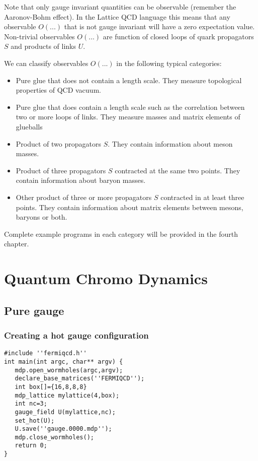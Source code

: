 Note that only gauge invariant quantities can be observable (remember the
Aaronov-Bohm effect). In the Lattice QCD language this means that any
observable $O(...)$ that is not gauge invariant will have a zero expectation
value. Non-trivial observables $O(...)$ are function of closed loops of
quark propagators $S$ and products of links $U$.

We can classify observables $O(...)$ in the following typical categories:

\begin{itemize}
\item  Pure glue that does not contain a length scale. They measure
topological properties of QCD vacuum.

\item  Pure glue that does contain a length scale such as the correlation
between two or more loops of links. They measure masses and matrix elements
of glueballs

\item  Product of two propagators $S$. They contain information about meson
masses.

\item  Product of three propagators $S$ contracted at the same two points.
They contain information about baryon masses.

\item  Other product of three or more propagators $S$ contracted in at least
three points. They contain information about matrix elements between mesons,
baryons or both.
\end{itemize}

Complete example programs in each category will be provided in the fourth
chapter.

\section{Quantum Chromo Dynamics}

\subsection{Pure gauge}

\subsubsection{Creating a hot gauge configuration}
\begin{verbatim}
#include ''fermiqcd.h''
int main(int argc, char** argv) {
   mdp.open_wormholes(argc,argv);
   declare_base_matrices(''FERMIQCD'');
   int box[]={16,8,8,8}
   mdp_lattice mylattice(4,box);
   int nc=3;
   gauge_field U(mylattice,nc);
   set_hot(U);
   U.save(''gauge.0000.mdp'');
   mdp.close_wormholes();
   return 0;
}
\end{verbatim}

